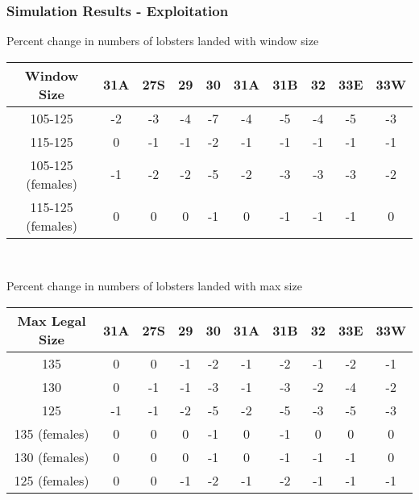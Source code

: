 \documentclass{beamer}
\begin{document}
\begin{frame}
\frametitle{Simulation Results - Exploitation}
Percent change in numbers of lobsters landed with window size 
\centering
\begin{tabular}{|c|c|c|c|c|c|c|c|c|c|}
\hline
Window Size       & 31A & 27S & 29 & 30 & 31A & 31B & 32 & 33E & 33W \\
\hline
105-125           & -2 & -3 & -4 & -7 & -4 & -5 & -4 & -5 & -3 \\
\hline
115-125           & 0 & -1 & -1 & -2 & -1 & -1 & -1 & -1 & -1 \\
\hline
105-125 (females) & -1 & -2 & -2 & -5 & -2 & -3 & -3 & -3 & -2 \\
\hline
115-125 (females)  & 0 & 0 & 0 & -1 & 0 & -1 & -1 & -1 & 0 \\
\hline
 
\end{tabular}\\
\vspace{5mm}

Percent change in numbers of lobsters landed with max size 
\centering
\begin{tabular}{|c|c|c|c|c|c|c|c|c|c|}
\hline
Max Legal Size & 31A & 27S & 29 & 30 & 31A & 31B & 32 & 33E & 33W \\
\hline
135            & 0 & 0 & -1 & -2 & -1 & -2 & -1 & -2 & -1 \\
\hline
130            & 0 & -1 & -1 & -3 & -1 & -3 & -2 & -4 & -2 \\
\hline
125            & -1 & -1 & -2 & -5 & -2 & -5 & -3 & -5 & -3 \\
\hline
135 (females)   & 0 & 0 & 0 & -1 & 0 & -1 & 0 & 0 & 0 \\
\hline
130 (females)   & 0 & 0 & 0 & -1 & 0 & -1 & -1 & -1 & 0 \\
\hline
125 (females)   & 0 & 0 & -1 & -2 & -1 & -2 & -1 & -1 & -1 \\
\hline
 
 
\end{tabular}
\end{frame}
\end{document}
